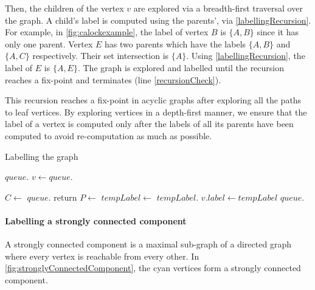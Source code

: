 Then, the children of the vertex $v$ are explored via a breadth-first traversal over the graph. A child's label is computed using the parents', via \cref{labellingRecursion}. For example, in \cref{fig:calockexample}, the label of vertex $B$ is $\{A, B\}$ since it has only one parent. Vertex $E$ has two parents which have the labels $\{A, B\}$ and $\{A, C\}$ respectively. Their set intersection is $\{A\}$. Using \cref{labellingRecursion}, the label of $E$ is $\{A, E\}$. The graph is explored and labelled until the recursion reaches a fix-point and terminates (line \ref{recursionCheck}). 

This recursion reaches a fix-point in acyclic graphs after exploring all the paths to leaf vertices. By exploring vertices in a depth-first manner, we ensure that the label of a vertex is computed only after the labels of all its parents have been computed to avoid re-computation as much as possible.


\begin{algorithm}[h]
	\caption{Labelling the graph}
	\begin{algorithmic}[1]
		\State $queue$.
		\State $v\gets queue.$
		\State {}
		\EndWhile
		\EndProcedure
		\Statex

		\State $C\gets$
		 \label{rootLabellingBegin}
		\State $queue.$
		\State return
		\EndIf\label{rootLabellingEnd}
		\State $P\gets$\label{labellingRelationImplBegin}
		\State $tempLabel\gets$\label{intersectionStart}
		\State $tempLabel$. \label{intersectionEnd}
		 \label{recursionCheck}
		\State $v.label\gets tempLabel$
		\State $queue.$
		\EndIf \label{labellingRelationImplEnd}
		\EndProcedure
	\end{algorithmic}
	\label{labelAssignment}
\end{algorithm}


\paragraph{Labelling a strongly connected component}
A strongly connected component is a maximal sub-graph of a directed graph where every vertex is reachable from every other. 
In \cref{fig:stronglyConnectedComponent}, the cyan vertices form a strongly connected component.


